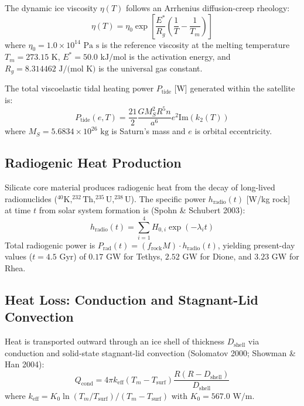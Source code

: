 \documentclass[11pt,a4paper]{article}
\begin{document}
The dynamic ice viscosity $\eta(T)$ follows an Arrhenius diffusion-creep rheology:
\begin{equation}
\eta(T) = \eta_0 \exp\left[ \frac{E^*}{R_g} \left(\frac{1}{T} - \frac{1}{T_m}\right) \right]
\end{equation}
where $\eta_0 = 1.0 \times 10^{14}\text{ Pa s}$ is the reference viscosity at the melting temperature $T_m = 273.15\text{ K}$, $E^* = 50.0\text{ kJ/mol}$ is the activation energy, and $R_g = 8.314462\text{ J/(mol K)}$ is the universal gas constant.

The total viscoelastic tidal heating power $P_{\text{tide}}$ [W] generated within the satellite is:
\begin{equation}
P_{\text{tide}}(e, T) = \frac{21}{2} \frac{G M_S^2 R^5 n}{a^6} e^2 \mathrm{Im}(k_2(T))
\end{equation}
where $M_S = 5.6834 \times 10^{26}\text{ kg}$ is Saturn's mass and $e$ is orbital eccentricity.

\subsection{Radiogenic Heat Production}
Silicate core material produces radiogenic heat from the decay of long-lived radionuclides ($^{40}\mathrm{K}, ^{232}\mathrm{Th}, ^{235}\mathrm{U}, ^{238}\mathrm{U}$). The specific power $h_{\text{radio}}(t)$ [W/kg rock] at time $t$ from solar system formation is (Spohn \& Schubert 2003):
\begin{equation}
h_{\text{radio}}(t) = \sum_{i=1}^4 H_{0,i} \exp(-\lambda_i t)
\end{equation}
Total radiogenic power is $P_{\text{rad}}(t) = (f_{\text{rock}} M) \cdot h_{\text{radio}}(t)$, yielding present-day values ($t = 4.5\text{ Gyr}$) of $0.17\text{ GW}$ for Tethys, $2.52\text{ GW}$ for Dione, and $3.23\text{ GW}$ for Rhea.

\subsection{Heat Loss: Conduction and Stagnant-Lid Convection}
Heat is transported outward through an ice shell of thickness $D_{\text{shell}}$ via conduction and solid-state stagnant-lid convection (Solomatov 2000; Showman \& Han 2004):
\begin{equation}
Q_{\text{cond}} = 4\pi k_{\text{eff}} (T_m - T_{\text{surf}}) \frac{R(R - D_{\text{shell}})}{D_{\text{shell}}}
\end{equation}
where $k_{\text{eff}} = K_0 \ln(T_m / T_{\text{surf}}) / (T_m - T_{\text{surf}})$ with $K_0 = 567.0\text{ W/m}$.
\end{document}
